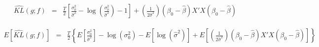 \documentclass[12pt]{article}
\theoremstyle{definition}
\begin{document}
\begin{eqnarray*}
	\widehat{KL}(g;f) &=& \frac{T}{2}\left[\frac{\sigma_0^2}{\widehat{\sigma}^2}  - \log\left(\frac{\sigma_0^2}{\widehat{\sigma}^2} \right) - 1\right] + \left(\frac{1}{2\widehat{\sigma}^2} \right)\left(\beta_0 - \widehat{\beta}\right)X'X\left(\beta_0 - \widehat{\beta}\right)
\end{eqnarray*}

\begin{eqnarray*}
	E\left[\widehat{KL}(g;f) \right] &=&\frac{T}{2}\left\{  E\left[\frac{\sigma_0^2}{\widehat{\sigma}^2} \right]  - \log(\sigma_0^2) - E\left[\log(\widehat{\sigma}^2)\right] + E\left[\left(\frac{1}{2\widehat{\sigma}^2} \right)\left(\beta_0 - \widehat{\beta}\right)X'X\left(\beta_0 - \widehat{\beta}\right) \right] \right\}
\end{eqnarray*}
\end{document}
